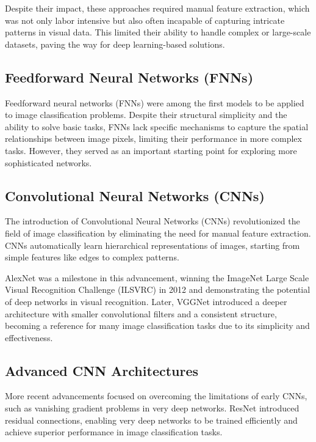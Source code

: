 Despite their impact, these approaches required manual feature extraction, which was not only labor intensive but also often incapable of capturing intricate patterns in visual data. This limited their ability to handle complex or large-scale datasets, paving the way for deep learning-based solutions.

\subsection{Feedforward Neural Networks (FNNs)}

Feedforward neural networks (FNNs) were among the first models to be applied to image classification problems. Despite their structural simplicity and the ability to solve basic tasks, FNNs lack specific mechanisms to capture the spatial relationships between image pixels, limiting their performance in more complex tasks. However, they served as an important starting point for exploring more sophisticated networks.

\subsection{Convolutional Neural Networks (CNNs)}

The introduction of Convolutional Neural Networks (CNNs) revolutionized the field of image classification by eliminating the need for manual feature extraction. CNNs automatically learn hierarchical representations of images, starting from simple features like edges to complex patterns.

AlexNet \cite{alexnet} was a milestone in this advancement, winning the ImageNet Large Scale Visual Recognition Challenge (ILSVRC) in 2012 and demonstrating the potential of deep networks in visual recognition. Later, VGGNet \cite{vgnet} introduced a deeper architecture with smaller convolutional filters and a consistent structure, becoming a reference for many image classification tasks due to its simplicity and effectiveness.

\subsection{Advanced CNN Architectures}

More recent advancements focused on overcoming the limitations of early CNNs, such as vanishing gradient problems in very deep networks. ResNet \cite{resnet} introduced residual connections, enabling very deep networks to be trained efficiently and achieve superior performance in image classification tasks.

